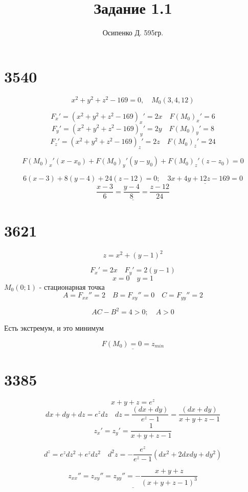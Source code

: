 \documentclass[a4paper, 12pt]{article}
\title{Задание 1.1}
\author{Осипенко Д. 595гр.}
\begin{document}
\sffamily
\maketitle
\section*{3540}
\[
	x^2 + y^2 + z^2 - 169 = 0, \quad M_0 (3,4,12)
\]

\[
	F_x' = (x^2 + y^2 + z^2 - 169 )_x'= 2x \quad F(M_0)_x' = 6
\]
\[
	F_y' = (x^2 + y^2 + z^2 - 169)_y' = 2y \quad F(M_0)_y' = 8	
\]
\[
	F_z' = (x^2 + y^2 + z^2 - 169)_z' = 2z \quad F(M_0)_z' = 24
\]

\[
	F(M_0)_x'(x-x_0)+F(M_0)_y'(y-y_0)+F(M_0)_z'(z-z_0) = 0
\]

\[
	6(x - 3) + 8(y - 4) + 24(z - 12) = 0; \quad \underline{3x + 4y + 12z - 169 = 0}
\]
\[
	\underline{\frac{x - 3}{6} = \frac{y - 4}{8} = \frac{z - 12}{24}}
\]
\section*{3621}
\[
	z = x^2 + (y - 1)^2
\]

\[
	F_x' = 2x \quad F_y' = 2(y-1)
\]
\[
	x = 0 \quad y = 1
\]
$ M_0(0;1) $ - стационарная точка\\
\[
 	A = F_{xx}'' = 2 \quad B = F_{xy}''= 0 \quad C = F_{yy}'' = 2
 \]

\[
	AC - B^2 = 4 > 0; \quad A > 0
\]

Есть экстремум, и это минимум

\[
	\underline{F(M_0) = 0 = z_{min}}
\]

\section*{3385}
\[
	x + y + z = e^z
\]
\[
	dx + dy + dz = e^z dz \quad dz = \frac{(dx+dy)}{e^z - 1} = \frac{(dx+dy)}{x + y + z - 1}
\]
\[
	z_x' = z_y' = \frac{1}{x + y + z - 1} 
\]

\[
	d^z = e^z dz^2 + e^zdz^2 \quad d^2 z = -\frac{e^z}{e^z-1}(dx^2 + 2dxdy + dy^2)
\]

\[
	\underline{z_{xx}'' = z_{xy}''=z_{yy}'' = -\frac{x+y+z}{(x+y+z-1)^3}}
\]
\end{document}
